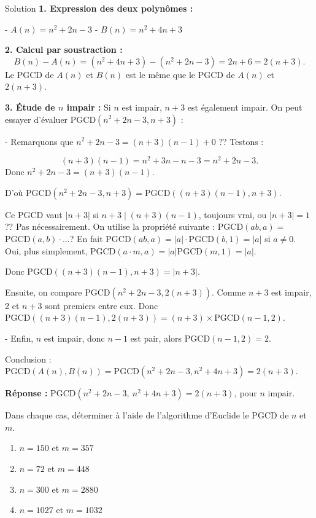 \documentclass[a4paper,12pt]{article}
\begin{document}
\begin{solutionbox}{Solution}
\textbf{1. Expression des deux polynômes :}

- $A(n) = n^2 + 2n -3$
- $B(n) = n^2 +4n +3$

\textbf{2. Calcul par soustraction :}
\[
B(n) - A(n) = (n^2 +4n +3) - (n^2 +2n -3) = 2n +6 = 2(n+3).
\]
Le PGCD de $A(n)$ et $B(n)$ est le même que le PGCD de $A(n)$ et $2(n+3)$.

\textbf{3. Étude de $n$ impair :}
Si $n$ est impair, $n+3$ est également impair.  
On peut essayer d’évaluer $\mathrm{PGCD}(n^2+2n-3, n+3)$ :

- Remarquons que $n^2+2n-3= (n+3)(n-1) +0$ ?? Testons :

\[
(n+3)(n-1)=n^2 +3n -n -3 =n^2+2n-3.
\]
Donc $n^2+2n-3=(n+3)(n-1)$.

D’où $\mathrm{PGCD}(n^2+2n-3, n+3)= \mathrm{PGCD}((n+3)(n-1), n+3)$.

Ce PGCD vaut $|n+3|$ si $n+3 \mid (n+3)(n-1)$, toujours vrai, ou $|n+3|=1$?? Pas nécessairement. On utilise la propriété suivante : PGCD$(ab,a)=$ PGCD$(a,b)\cdot \dots$? En fait $\mathrm{PGCD}(ab,a)=|a|\cdot \mathrm{PGCD}(b,1)=|a|$ si $a \neq 0$. Oui, plus simplement, $\mathrm{PGCD}(a\cdot m,a)=|a|\mathrm{PGCD}(m,1)=|a|$. 

Donc $\mathrm{PGCD}((n+3)(n-1), n+3)= |n+3|$.

Ensuite, on compare $\mathrm{PGCD}(n^2+2n-3,2(n+3))$. Comme $n+3$ est impair, 2 et $n+3$ sont premiers entre eux. Donc 
$\mathrm{PGCD}((n+3)(n-1),2(n+3))= (n+3)\times\mathrm{PGCD}(n-1,2).$

- Enfin, $n$ est impair, donc $n-1$ est pair, alors $\mathrm{PGCD}(n-1,2)=2.$

Conclusion : $\mathrm{PGCD}(A(n),B(n))=\mathrm{PGCD}(n^2+2n-3,n^2+4n+3) = 2(n+3).$

\textbf{Réponse :} 
$\boxed{\mathrm{PGCD}(n^2+2n-3,\ n^2+4n+3)=2(n+3),\ \text{pour }n\text{ impair}.}$
\end{solutionbox}

\begin{exercice}[title=Exercice 7 $\quad \star \quad$ { [Calculer] }]
Dans chaque cas, déterminer à l’aide de l’algorithme d’Euclide le PGCD de $n$ et $m$.
\begin{enumerate}
    \item $n = 150$ et $m = 357$
    \item $n = 72$ et $m = 448$
    \item $n = 300$ et $m = 2880$
    \item $n = 1027$ et $m = 1032$
\end{enumerate}
\end{exercice}
\end{document}
